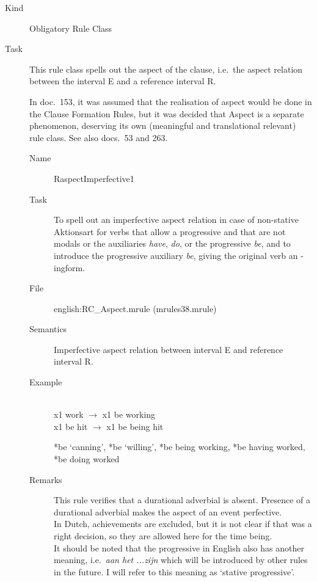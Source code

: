 \begin{description}
\item[Kind] Obligatory Rule Class
\item[Task] This rule class spells out the aspect of the clause, 
i.e.\  the aspect relation between the interval E and a reference interval R.

In doc.\ 153, it was assumed that the realisation of aspect would be done in 
the Clause Formation Rules, but it was decided that Aspect is a separate 
phenomenon, deserving its own (meaningful and translational relevant) rule 
class. See also docs.\ 53 and 263.

\vspace{1 cm}
\begin{description}
\item[Name] RaspectImperfective1
\item[Task] To spell out an imperfective aspect relation in case of non-stative 
Aktionsart for verbs that allow a 
progressive and that are not modals or the auxiliaries {\em have}, {\em do}, 
or the progressive {\em be}, 
and to introduce the progressive auxiliary {\em be\/}, giving
the original verb an -ingform.
\item[File] english:RC\_Aspect.mrule (mrules38.mrule)
\item[Semantics] Imperfective aspect relation between interval E and reference 
interval R.
\item[Example] \mbox{}\\
x1 work $\rightarrow$ x1 be working\\
x1 be hit $\rightarrow$ x1 be being hit

*be `canning',
*be `willing',
*be being working,
*be having worked,
*be doing worked
\item[Remarks] 
This rule verifies that a durational adverbial is absent. Presence of a 
durational adverbial makes the aspect of an event perfective.\\
In Dutch, achievements are excluded, but it is not clear if that was a right 
decision, so they are allowed here for the time being.\\
It should be noted that the progressive in English also has another meaning,
i.e.\ {\em aan het ...zijn} which will be introduced by other rules in the 
future. I will refer to this meaning as `stative progressive'.
\end{description}


\end{description}
